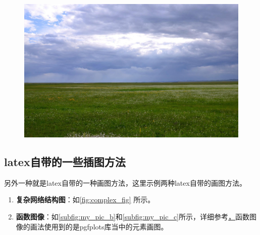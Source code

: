\begin{figure}[htbp]
{\begin{minipage}[t]{0.48\linewidth}
            \centering
            \includegraphics[width=0.9\linewidth]{figures/xilinguole.jpeg}
        \end{minipage}
    }\vspace{-0.1cm}
    \centering
\end{figure}

\subsection{latex自带的一些插图方法}

另外一种就是latex自带的一种画图方法，这里示例两种latex自带的画图方法。
\begin{enumerate}
    \item \textbf{复杂网络结构图}：如\autoref{fig:complex_fig} 所示。
    \item \textbf{函数图像}：如\autoref{subfig:my_pic_b}和\autoref{subfig:my_pic_c}所示，详细参考\href{https://pgfplots.sourceforge.net/gallery.html}，函数图像的画法使用到的是pgfplots库当中的元素画图。
\end{enumerate}

